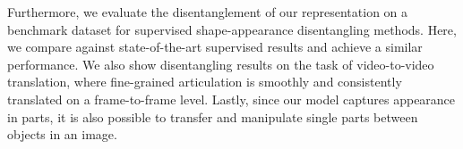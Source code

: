 Furthermore, we evaluate the disentanglement of our representation on
a benchmark dataset for supervised shape-appearance disentangling methods.
Here, we compare against state-of-the-art supervised results and achieve a similar performance.
We also show disentangling results on the task of video-to-video translation, where fine-grained articulation is smoothly and consistently translated on a frame-to-frame level.
Lastly, since our model captures appearance in parts, it is also possible to transfer and manipulate single parts between objects in an image.
